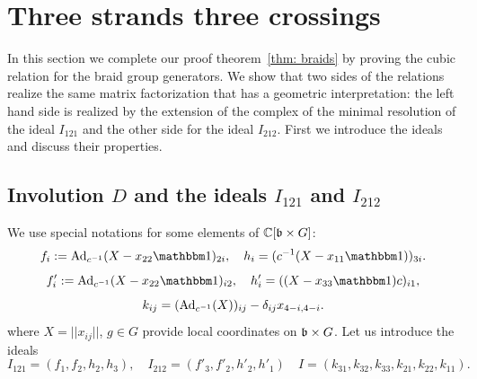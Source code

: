 



\section{Three strands three crossings}\label{sec:  three str 3}

\def\xoo{x_{11}}
\def\xot{x_{12}}
\def\xoh{x_{13}}
\def\xtt{x_{22}}
\def\xth{x_{23}}

\def\yot{y_{12}}
\def\yoh{y_{13}}
\def\yth{y_{23}}

\def\zto{z_{21}}
\def\zho{z_{31}}
\def\zht{z_{32}}


\def\brh{ h }
\def\brht{ \brh_2 }
\def\briht{ \brh^{-1}_2 }
\def\ybet{ \beta }
\def\ybetth{ \ybet_{23} }
\def\ybettt{ \ybet_{22} }
\def\ybethh{ \ybet_{33} }
\def\ybetoo{ \ybet_{11}}
\def\ybetot{ \ybet_{12}}
\def\ybetto{ \ybet_{21}}
\def\ybetooi{ \ybet_{11}^{-1}}



\def\aiv#1#2{ (a^{-1})_{#1#2}}
\def\aioo{\aiv{1}{1}}
\def\aiot{\aiv{1}{2}}
\def\aioh{\aiv{1}{3}}
\def\aito{\aiv{2}{1}}
\def\aitt{\aiv{2}{2}}
\def\aith{\aiv{2}{3}}
\def\aiho{\aiv{3}{1}}
\def\aiht{\aiv{3}{2}}
\def\aihh{\aiv{3}{3}}
\def\civ#1#2{ (c^{-1})_{#1#2}}
\def\cioo{\civ{1}{1}}
\def\ciot{\civ{1}{2}}
\def\cioh{\civ{1}{3}}
\def\cito{\civ{2}{1}}
\def\citt{\civ{2}{2}}
\def\cith{\civ{2}{3}}
\def\ciho{\civ{3}{1}}
\def\ciht{\civ{3}{2}}
\def\cihh{\civ{3}{3}}
\def\biv#1#2{ (b^{-1})_{#1#2} }


\def\tho{ \theta_1 }
\def\thw{ \theta_2 }
\def\thh{ \theta_3 }



\def\zXv#1{ X - x_{#1#1}\xId}
\def\zXuv#1#2{ \bigl( \zXv{#1}\bigr)_{#2}}
\def\zXtv#1{ \zXuv{2}{#1}}


\def\krdlv#1{ \delta_{#1} }

In this section we complete our proof theorem~\ref{thm: braids} by proving the cubic relation for the braid group generators.
We show that two sides of the relations realize the same matrix factorization that has a geometric interpretation: the left hand side
is realized by the extension of the complex of the minimal resolution of the ideal $I_{121}$ and the other side for the ideal $I_{212}$.
First we introduce the ideals and discuss their properties.

\subsection{Involution $D$ and the ideals $I_{121}$ and $I_{212}$}
We use special notations  for some elements of $\mathbb{C}[\mathfrak{b}\times G]$:
$$f_i:=\Ad_{c^{-1}}(X-x_{22}\xId)_{2i},\quad h_i=(c^{-1}(X-x_{11}\xId))_{3i}.$$
$$f'_i:=\Ad_{c^{-1}}(X-x_{22}\xId)_{i2},\quad h'_i=((X-x_{33}\xId)c)_{i1},$$
$$ k_{ij}=({\rm Ad}_{c^{-1}}(X))_{ij}-\delta_{ij} x_{4-i,4-i}.$$
where $X=|| x_{ij}||$, $g\in G$ provide local coordinates on $\mathfrak{b}\times G$. Let us introduce the ideals
$$ I_{121}=(f_1,f_2,h_2,h_3),\quad I_{212}=(f'_3,f'_2,h'_2,h'_1) \quad I=(k_{31},k_{32},k_{33},k_{21},k_{22},k_{11}).$$






